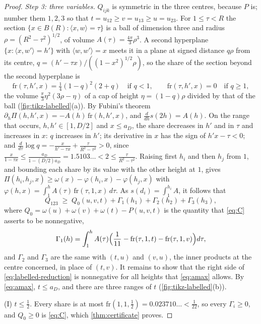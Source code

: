 \documentclass[11pt,reqno]{amsart}
\renewcommand{\_}{\origunderscore\allowbreak}
\numberwithin{equation}{section}
\theoremstyle{plain}
\theoremstyle{definition}
\theoremstyle{remark}
\begin{document}
\begin{proof}
\emph{Step 3: three variables.} $Q_{ijk}$ is symmetric in the three
centres, because $P$ is; number them $1,2,3$ so that
$t=u_{12}\ge v=u_{13}\ge u=u_{23}$. For $1\le\tau<R$ the section
$\{x\in B(R):\langle x,w\rangle=\tau\}$ is a ball of dimension three and
radius $\rho=(R^2-\tau^2)^{1/2}$, of volume $A(\tau)=\frac{4\pi}3\rho^3$.
A second hyperplane $\{x:\langle x,w'\rangle=h'\}$ with
$\langle w,w'\rangle=x$ meets it in a plane at signed distance $q\rho$
from its centre, $q=(h'-\tau x)/((1-x^2)^{1/2}\rho)$, so the share of the
section beyond the second hyperplane is
\[
  \mathrm{fr}(\tau,h',x)=\tfrac14(1-q)^2(2+q)\quad\text{if }q<1,
  \qquad\mathrm{fr}(\tau,h',x)=0\quad\text{if }q\ge1,
\]
the volume $\frac\pi3\eta^2(3\rho-\eta)$ of a cap of height
$\eta=(1-q)\rho$ divided by that of the ball
(\cref{fig:tikz-labelled}(a)). By Fubini's theorem
$\partial_h\Pi(h,h',x)=-A(h)\,\mathrm{fr}(h,h',x)$, and
$\frac d{dh}s(2h)=A(h)$. On the range that occurs, $h,h'\in[1,D/2]$ and
$x\le a_D$, the share decreases in $h'$ and in $\tau$ and increases in
$x$: $q$ increases in $h'$; its derivative in $x$ has the sign of
$h'x-\tau<0$; and
$\frac d{d\tau}\log q=-\frac x{h'-\tau x}+\frac\tau{R^2-\tau^2}>0$, since
$\frac x{1-\tau x}\le\frac{a_D}{1-(D/2)a_D}=1.5103\ldots<2\le\frac\tau{R^2-\tau^2}$.
Raising first $h_i$ and then $h_j$ from $1$, and bounding each share by
its value with the other height at $1$, gives
$\Pi(h_i,h_j,x)\ge\omega(x)-\varphi(h_i,x)-\varphi(h_j,x)$ with
$\varphi(h,x)=\int_1^hA(\tau)\,\mathrm{fr}(\tau,1,x)\,d\tau$. As
$s(d_i)=\int_1^{h_i}A$, it follows that
\begin{equation}\label{eq:labelled-reduction}
  Q_{123}\;\ge\;Q_0(u,v,t)+\Gamma_1(h_1)+\Gamma_2(h_2)+\Gamma_3(h_3),
\end{equation}
where $Q_0=\omega(u)+\omega(v)+\omega(t)-P(u,v,t)$ is the quantity that
\eqref{eq:C} asserts to be nonnegative,
\[
  \Gamma_1(h)=\int_1^hA(\tau)\Bigl(\frac1{11}-\mathrm{fr}(\tau,1,t)
  -\mathrm{fr}(\tau,1,v)\Bigr)d\tau ,
\]
and $\Gamma_2$ and $\Gamma_3$ are the same with $(t,u)$ and $(v,u)$, the
inner products at the centre concerned, in place of $(t,v)$. It remains
to show that the right side of \eqref{eq:labelled-reduction} is
nonnegative for all heights that \eqref{eq:amax} allows. By
\eqref{eq:amax}, $t\le a_D$, and there are three ranges of $t$
(\cref{fig:tikz-labelled}(b)).

(I) $t\le\frac12$. Every share is at most
$\mathrm{fr}(1,1,\frac12)=0.023710\ldots<\frac1{22}$, so every
$\Gamma_i\ge0$, and $Q_0\ge0$ is \eqref{eq:C}, which
\cref{thm:certificate} proves.


\end{proof}
\end{document}
